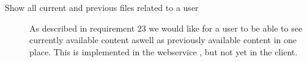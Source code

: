 \begin{description}
\item[Show all current and previous files related to a user] As described in requirement
23 we would like for a user to be able to see currently available content aswell as previously
available content in one place. This is implemented in the webservice , but not yet in the
client.
\end{description}
